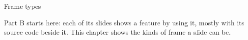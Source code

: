 
\begin{sectionframe}{Frame types}
	\begin{minipage}[t]{0.9\linewidth}\small
		Part B starts here: each of its slides shows a feature by using it, mostly with its source code beside it. This chapter shows the kinds of frame a slide can be.
	\end{minipage}\par\medskip
	\SMChapterAgenda
\end{sectionframe}
